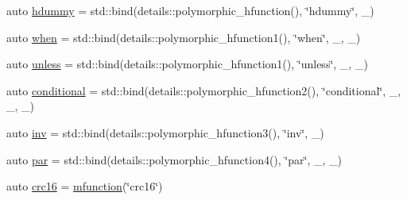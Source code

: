 \begin{DoxyCompactItemize}
\item 
auto \hyperlink{namespacepfq_1_1lang_1_1anonymous__namespace_02default_8hpp_03_a5ce9765c320b01cb2c6d9b9cba0f13ff}{hdummy} = std\+::bind(details\+::polymorphic\+\_\+hfunction(), \char`\"{}hdummy\char`\"{}, \+\_)
\item 
auto \hyperlink{namespacepfq_1_1lang_1_1anonymous__namespace_02default_8hpp_03_a22ae8d6c01ae06cdfa698cf9198d292b}{when} = std\+::bind(details\+::polymorphic\+\_\+hfunction1(), \char`\"{}when\char`\"{}, \+\_, \+\_)
\item 
auto \hyperlink{namespacepfq_1_1lang_1_1anonymous__namespace_02default_8hpp_03_a4873d64e4d84c7c4c4cabe782de2b7b0}{unless} = std\+::bind(details\+::polymorphic\+\_\+hfunction1(), \char`\"{}unless\char`\"{}, \+\_, \+\_)
\item 
auto \hyperlink{namespacepfq_1_1lang_1_1anonymous__namespace_02default_8hpp_03_a99247b15a4e37c0aaec60838716fc8dc}{conditional} = std\+::bind(details\+::polymorphic\+\_\+hfunction2(), \char`\"{}conditional\char`\"{}, \+\_, \+\_, \+\_)
\item 
auto \hyperlink{namespacepfq_1_1lang_1_1anonymous__namespace_02default_8hpp_03_a4e7c9b70d87164407c1dd1100ddd8363}{inv} = std\+::bind(details\+::polymorphic\+\_\+hfunction3(), \char`\"{}inv\char`\"{}, \+\_)
\item 
auto \hyperlink{namespacepfq_1_1lang_1_1anonymous__namespace_02default_8hpp_03_abd0f7876a26a959f9fc211cc23599493}{par} = std\+::bind(details\+::polymorphic\+\_\+hfunction4(), \char`\"{}par\char`\"{}, \+\_, \+\_)
\item 
auto \hyperlink{namespacepfq_1_1lang_1_1anonymous__namespace_02default_8hpp_03_a358abfac3e7be63cbb4557616ab81f31}{crc16} = \hyperlink{namespacepfq_1_1lang_ac3ec84f09576bf5fb5db464623a4c165}{mfunction}(\char`\"{}crc16\char`\"{})
\end{DoxyCompactItemize}


